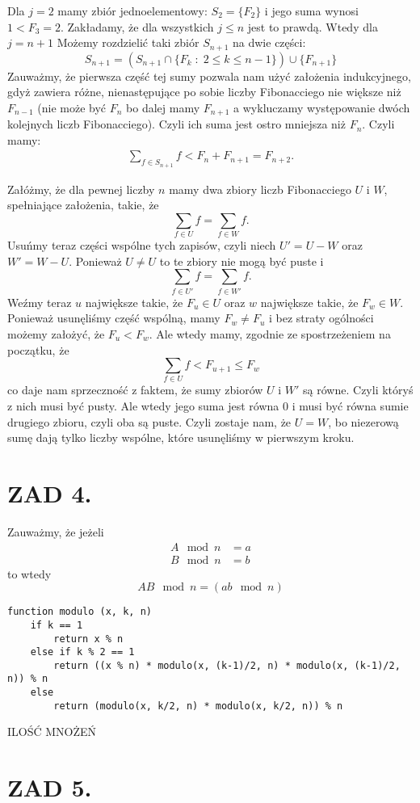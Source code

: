 \documentclass{article}[13pt]
\begin{document}
    Dla $j=2$ mamy zbiór jednoelementowy: $S_2=\{F_2\}$ i jego suma wynosi $1<F_3=2$. Zakładamy, że dla wszystkich $j\leq n$ jest to prawdą. Wtedy dla $j=n+1$ Możemy rozdzielić taki zbiór $S_{n+1}$ na dwie części:
    $$S_{n+1}=(S_{n+1}\cap\{F_k\;:\;2\leq k\leq n-1\})\cup\{F_{n+1}\}$$
    Zauważmy, że pierwsza część tej sumy pozwala nam użyć założenia indukcyjnego, gdyż zawiera różne, nienastępujące po sobie liczby Fibonacciego nie większe niż $F_{n-1}$ (nie może być $F_n$ bo dalej mamy $F_{n+1}$ a wykluczamy występowanie dwóch kolejnych liczb Fibonacciego). Czyli ich suma jest ostro mniejsza niż $F_{n}$. Czyli mamy:
    \begin{align*}
        \sum\limits_{f\in S_{n+1}}f<F_n+F_{n+1}=F_{n+2}.
    \end{align*}

    Załóżmy, że dla pewnej liczby $n$ mamy dwa zbiory liczb Fibonacciego $U$ i $W$, spełniające założenia, takie, że
    $$\sum\limits_{f\in U}f=\sum\limits_{f\in W}f.$$
    Usuńmy teraz części wspólne tych zapisów, czyli niech $U'=U-W$ oraz $W'=W-U$. Ponieważ $U\neq U$ to te zbiory nie mogą być puste i 
    $$\sum\limits_{f\in U'}f=\sum\limits_{f\in W'}f.$$
    Weźmy teraz $u$ największe takie, że $F_u\in U$ oraz $w$ największe takie, że $F_w\in W$. Ponieważ usunęliśmy część wspólną, mamy $F_w\neq F_u$ i bez straty ogólności możemy założyć, że $F_u<F_w$. Ale wtedy mamy, zgodnie ze spostrzeżeniem na początku, że
    $$\sum\limits_{f\in U}f<F_{u+1}\leq F_w$$
    co daje nam sprzeczność z faktem, że sumy zbiorów $U$ i $W'$ są równe. Czyli któryś z nich musi być pusty. Ale wtedy jego suma jest równa 0 i musi być równa sumie drugiego zbioru, czyli oba są puste. Czyli zostaje nam, że $U=W$, bo niezerową sumę dają tylko liczby wspólne, które usunęliśmy w pierwszym kroku.

    
    \section*{ZAD 4.}

    Zauważmy, że jeżeli
    \begin{align*}
        A\mod n&=a\\
        B\mod n&=b
    \end{align*}
    to wtedy
    $$AB\mod n=(ab\mod n)$$

\begin{lstlisting}[language=juleczka]
function modulo (x, k, n)
    if k == 1
        return x % n
    else if k % 2 == 1
        return ((x % n) * modulo(x, (k-1)/2, n) * modulo(x, (k-1)/2, n)) % n
    else
        return (modulo(x, k/2, n) * modulo(x, k/2, n)) % n
\end{lstlisting}

{\color{acc}ILOŚĆ MNOŻEŃ}

\section*{ZAD 5.}

\begin{lstlisting}[language=juleczka]
\end{lstlisting}
\end{document}
